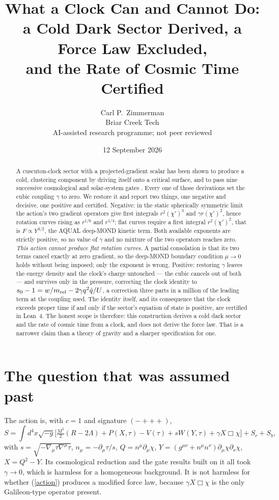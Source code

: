 \documentclass[11pt,letterpaper]{article}
\title{What a Clock Can and Cannot Do:\\ a Cold Dark Sector Derived, a Force Law Excluded,\\ and the Rate of Cosmic Time Certified}
\author{Carl P.\ Zimmerman\\ \small Briar Creek Tech\\ \small AI-assisted research programme; not peer reviewed}
\date{12 September 2026}
\begin{document}
\maketitle
\begin{abstract}
A cuscuton-clock sector with a projected-gradient scalar has been shown to produce a cold, clustering component by driving itself onto a critical surface, and to pass nine successive cosmological and solar-system gates \cite{paper19,paper20,paper21,paper22}. Every one of those derivations set the cubic coupling $\gamma$ to zero. We restore it and report two things, one negative and decisive, one positive and certified. Negative: in the static spherically symmetric limit the action's two gradient operators give first integrals $r^2(\chi')^3$ and $\gamma r(\chi')^2$, hence rotation curves rising as $r^{1/6}$ and $r^{1/4}$; flat curves require a first integral $r^2(\chi')^2$, that is $F\propto Y^{3/2}$, the AQUAL deep-MOND kinetic term. Both available exponents are strictly positive, so no value of $\gamma$ and no mixture of the two operators reaches zero. \emph{This action cannot produce flat rotation curves.} A partial consolation is that its two terms cancel exactly at zero gradient, so the deep-MOND boundary condition $\mu\to0$ holds without being imposed; only the exponent is wrong. Positive: restoring $\gamma$ leaves the energy density and the clock's charge untouched --- the cubic cancels out of both --- and survives only in the pressure, correcting the clock identity to $s_0-1=w/m_{\rm rel}-2\gamma q^2\dot q/U$, a correction three parts in a million of the leading term at the coupling used. The identity itself, and its consequence that the clock exceeds proper time if and only if the sector's equation of state is positive, are certified in Lean~4. The honest scope is therefore: this construction derives a cold dark sector and the rate of cosmic time from a clock, and does not derive the force law. That is a narrower claim than a theory of gravity and a sharper specification for one.
\end{abstract}

\section{The question that was assumed past}
The action \cite{paper13} is, with $c=1$ and signature $(-{+}{+}{+})$,
\begin{equation}
S=\int d^4x\sqrt{-g}\Big[\tfrac{M^2}{2}(R-2\Lambda)+P(X,\tau)-V(\tau)+sW(Y,\tau)+\gamma X\Box\chi\Big]+S_r+S_b,
\label{action}
\end{equation}
with $s=\sqrt{-\nabla_\mu\tau\nabla^\mu\tau}$, $n_\mu=-\partial_\mu\tau/s$, $Q=n^\mu\partial_\mu\chi$, $Y=(g^{\mu\nu}+n^\mu n^\nu)\partial_\mu\chi\partial_\nu\chi$, $X=Q^2-Y$. Its cosmological reduction and the gate results built on it \cite{paper19,paper20,paper21,paper22} all took $\gamma\to0$, which is harmless for a homogeneous background. It is not harmless for whether (\ref{action}) produces a modified force law, because $\gamma X\Box\chi$ is the only Galileon-type operator present.
\end{document}
